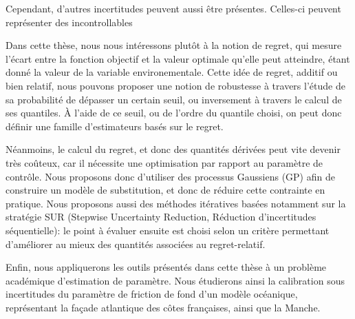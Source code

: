 Cependant, d'autres incertitudes peuvent aussi être
présentes. Celles-ci peuvent représenter des  incontrollables

Dans cette thèse, nous nous intéressons plutôt à la notion de regret,
qui mesure l'écart entre la fonction objectif et la valeur optimale
qu'elle peut atteindre, étant donné la valeur de la variable
environementale.  Cette idée de regret, additif ou bien relatif, nous
pouvons proposer une notion de robustesse à travers l'étude de sa
probabilité de dépasser un certain seuil, ou inversement à travers le
calcul de ses quantiles. À l'aide de ce seuil, ou de l'ordre du
quantile choisi, on peut donc définir une famille d'estimateurs basés
sur le regret.

Néanmoins, le calcul du regret, et donc des quantités dérivées peut
vite devenir très coûteux, car il nécessite une optimisation par
rapport au paramètre de contrôle. Nous proposons donc d'utiliser des
processus Gaussiens (GP) afin de construire un modèle de substitution,
et donc de réduire cette contrainte en pratique. Nous proposons aussi
des méthodes itératives basées notamment sur la stratégie SUR
(Stepwise Uncertainty Reduction, Réduction d'incertitudes
séquentielle): le point à évaluer ensuite est choisi selon un critère
permettant d'améliorer au mieux des quantités associées au
regret-relatif.

Enfin, nous appliquerons les outils présentés dans cette thèse à un
problème académique d'estimation de paramètre. Nous étudierons ainsi
la calibration sous incertitudes du paramètre de friction de fond d'un
modèle océanique, représentant la façade atlantique des côtes
françaises, ainsi que la Manche.


\vfill